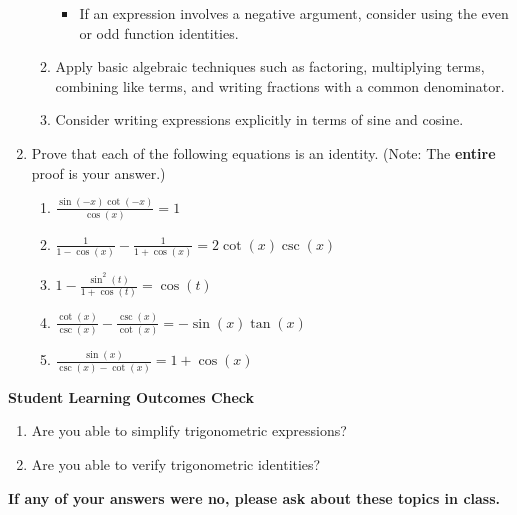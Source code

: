 \begin{enumerate}
\begin{boxthm}
\begin{enumerate}
\begin{itemize}
\item If an expression involves a negative argument, consider using the even or odd function identities.

\end{itemize}

\item Apply basic algebraic techniques such as factoring, multiplying terms, combining like terms, and writing fractions with a common denominator.

\item Consider writing expressions explicitly in terms of sine and cosine.

\end{enumerate}

\end{boxthm}

\newpage

\item Prove that each of the following equations is an identity. (Note: The {\bf entire} proof is your answer.)
\begin{enumerate}
\item $\displaystyle \frac{\sin(-x)\cot(-x)}{\cos(x)} = 1$
\vfill

\item $\displaystyle \frac{1}{1-\cos (x)}-\frac{1}{1+\cos (x)} = 2\cot (x)\csc (x)$
\vfill
\vfill
\newpage

\item $\displaystyle 1 - \frac{\sin^2(t)}{1+\cos(t)} = \cos(t)$
\vfill

\item $\displaystyle \frac{\cot(x)}{\csc(x)}-\frac{\csc(x)}{\cot(x)} = -\sin(x) \tan(x)$
\vfill

\newpage


\item $\displaystyle \frac{\sin(x)}{\csc(x) - \cot(x)} = 1+\cos(x)$
\vfill


\end{enumerate}


\end{enumerate}
\vfill
\noindent \textbf{Student Learning Outcomes Check}

\begin{enumerate}
\item Are you able to simplify trigonometric expressions?
\item Are you able to verify trigonometric identities?

\end{enumerate}

\noindent \textbf{If any of your answers were no, please ask about these topics in class.}

